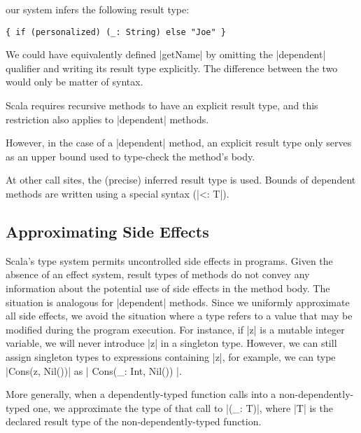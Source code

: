 \noindent
our system infers the following result type:

\begin{lstlisting}
{ if (personalized) (_: String) else "Joe" }
\end{lstlisting}

\noindent
We could have equivalently defined |getName| by omitting the |dependent| qualifier and writing its result type explicitly.
The difference between the two would only be matter of syntax.

Scala requires recursive methods to have an explicit result type, and this restriction also applies to |dependent| methods.
\begin{diff}
However, in the case of a |dependent| method, an explicit result type only serves as an upper bound used to type-check the method's body.
\end{diff}
At other call sites, the (precise) inferred result type is used.
Bounds of dependent methods are written using a special syntax (|<: T|).

\subsection{Approximating Side Effects}

Scala's type system permits uncontrolled side effects in programs.
Given the absence of an effect system, result types of methods do not convey any information about the potential use of side effects in the method body.
The situation is analogous for |dependent| methods.
Since we uniformly approximate all side effects, we avoid the situation where a type refers to a value that may be modified during the program execution.
For instance, if |z| is a mutable integer variable, we will never introduce |z| in a singleton type.
However, we can still assign singleton types to expressions containing |z|, for example, we can type |Cons(z, Nil())| as |{ Cons(_: Int, Nil()) }|.
\begin{diff}
More generally, when a dependently-typed function calls into a non-dependently-typed one, we approximate the type of that call to |(_: T)|, where |T| is the  declared result type of the non-dependently-typed function.
\end{diff}

